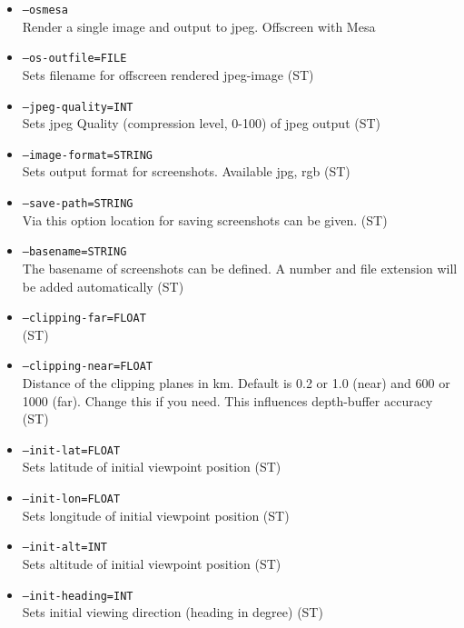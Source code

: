 \begin{itemize}
\item \texttt{--osmesa} \\
Render a single image and output to jpeg. Offscreen with Mesa

\item \texttt{--os-outfile=FILE} \\
Sets filename for offscreen rendered jpeg-image (ST)

\item \texttt{--jpeg-quality=INT} \\
Sets jpeg Quality (compression level, 0-100) of jpeg output (ST)

\item \texttt{--image-format=STRING} \\
Sets output format for screenshots. Available jpg, rgb (ST)

\item \texttt{--save-path=STRING}\\
Via this option location for saving screenshots can be given. (ST)

\item \texttt{--basename=STRING}\\
The basename of screenshots can be defined. A number and file extension will be added automatically (ST)

\item \texttt{--clipping-far=FLOAT}\\ (ST)
\item \texttt{--clipping-near=FLOAT}\\
Distance of the clipping planes in km. Default is 0.2 or 1.0 (near) and 600 or 1000 (far). Change this if you need.
This influences depth-buffer accuracy (ST)

\item \texttt{--init-lat=FLOAT} \\
Sets latitude of initial viewpoint position (ST)

\item \texttt{--init-lon=FLOAT} \\
Sets longitude of initial viewpoint position (ST)

\item \texttt{--init-alt=INT } \\
Sets altitude of initial viewpoint position (ST)

\item \texttt{--init-heading=INT } \\
Sets initial viewing direction (heading in degree) (ST)


\end{itemize}
